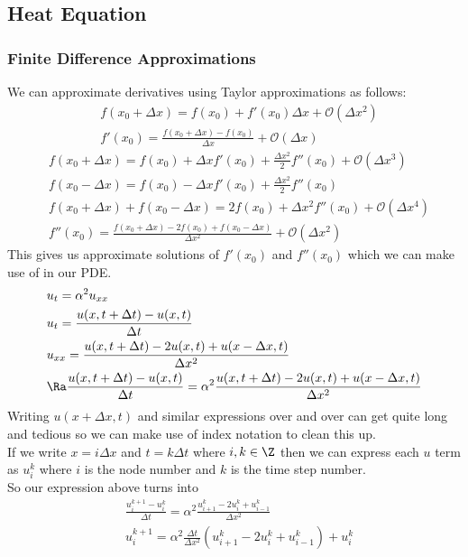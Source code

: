\subsection{Heat Equation}
\subsubsection{Finite Difference Approximations}
We can approximate derivatives using Taylor approximations as follows:
\begin{align*}
    &f(x_0+\Delta x)=f(x_0)+f'(x_0)\Delta x+\mathcal{O}(\Delta x^2)\\
    &f'(x_0)=\frac{f(x_0+\Delta x)-f(x_0)}{\Delta x}+\mathcal{O}(\Delta x)
\end{align*}
\begin{align*}
    &f(x_0+\Delta x)=f(x_0)+\Delta xf'(x_0)+\frac{\Delta x^2}{2}f''(x_0)+\mathcal{O}(\Delta x^3)\\
    &f(x_0-\Delta x)=f(x_0)-\Delta xf'(x_0)+\frac{\Delta x^2}{2}f''(x_0)\\
    &f(x_0+\Delta x)+f(x_0-\Delta x)=2f(x_0)+\Delta x^2f''(x_0)+\mathcal{O}(\Delta x^4)\\
    &f''(x_0)=\frac{f(x_0+\Delta x)-2f(x_0)+f(x_0-\Delta x)}{\Delta x^2}+\mathcal{O}(\Delta x^2)
\end{align*}
This gives us approximate solutions of $f'(x_0)$ and $f''(x_0)$ which we can make use of in our PDE.
\begin{align*}
    &u_t=\alpha^2u_{xx}\\
    &u_t=\frac{u(x,t+\Delta t)-u(x,t)}{\Delta t}\\
    &u_{xx}=\frac{u(x,t+\Delta t)-2u(x,t)+u(x-\Delta x,t)}{\Delta x^2}\\
    &\Ra \frac{u(x,t+\Delta t)-u(x,t)}{\Delta t}=\alpha^2\frac{u(x,t+\Delta t)-2u(x,t)+u(x-\Delta x,t)}{\Delta x^2}
\end{align*}
Writing $u(x+\Delta x,t)$ and similar expressions over and over can get quite long and tedious so we can make use of index notation to clean this up.\\
If we write $x=i\Delta x$ and $t=k\Delta t$ where $i,k\in\Z$ then we can express each $u$ term as $u_i^k$ where $i$ is the node number and $k$ is the time step number.\\
So our expression above turns into
\begin{align*}
    &\frac{u_i^{k+1}-u_i^k}{\Delta t}=\alpha^2\frac{u_{i+1}^k-2u_i^k+u_{i-1}^k}{\Delta x^2}\\
    &u_i^{k+1}=\alpha^2\frac{\Delta t}{\Delta x^2}(u_{i+1}^k-2u_i^k+u_{i-1}^k)+u_i^k
\end{align*}
